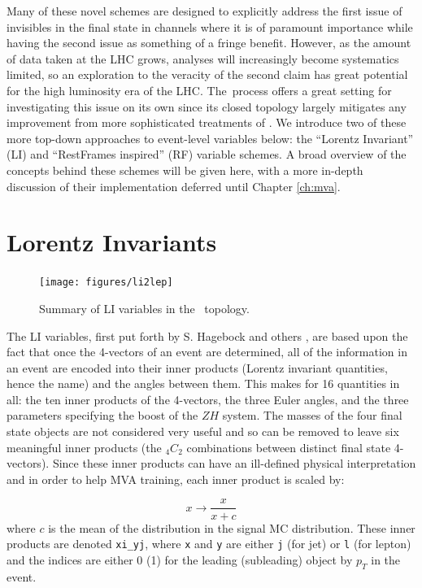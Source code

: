 Many of these novel schemes are designed to explicitly address the first issue of invisibles in the final state in channels where it is of paramount importance while having the second issue as something of a fringe benefit.  However, as the amount of data taken at the LHC grows, analyses will increasingly become systematics limited, so an exploration to the veracity of the second claim has great potential for the high luminosity era of the LHC.  The \ZH\,process offers a great setting for investigating this issue on its own since its closed topology largely mitigates any improvement from more sophisticated treatments of \met.  We introduce two of these more top-down approaches to event-level variables below: the ``Lorentz Invariant'' (LI) \cite{litalk} and ``RestFrames inspired'' (RF) \cite{rjr} variable schemes.  A broad overview of the concepts behind these schemes will be given here, with a more in-depth discussion of their implementation deferred until Chapter \ref{ch:mva}.


\section{Lorentz Invariants}
\label{sec:li}
\begin{figure}[!htbp]\captionsetup{justification=centering}
  \centering
  \texttt{[image: figures/li2lep]}
  \caption{Summary of LI variables in the \ZH\, topology.}
  \label{fig:li}
\end{figure}
  The LI variables, first put forth by S. Hagebock and others \cite{litalk}, are based upon the fact that once the 4-vectors of an event are determined, all of the information in an event are encoded into their inner products (Lorentz invariant quantities, hence the name) and the angles between them.  This makes for 16 quantities in all: the ten inner products of the 4-vectors, the three Euler angles, and the three parameters specifying the boost of the $ZH$ system.  The masses of the four final state objects are not considered very useful and so can be removed to leave six meaningful inner products (the $_4C_2$ combinations between distinct final state 4-vectors).  Since these inner products can have an ill-defined physical interpretation and in order to help MVA training, each inner product is scaled by:

\begin{equation}
\label{eqn:liip}
x\to\frac{x}{x+c}
\end{equation}
where $c$ is the mean of the distribution in the signal MC distribution.  These inner products are denoted \texttt{xi\_yj}, where \texttt{x} and \texttt{y} are either \texttt{j} (for jet) or \texttt{l} (for lepton) and the indices are either 0 (1) for the leading (subleading) object by $p_T$ in the event.

